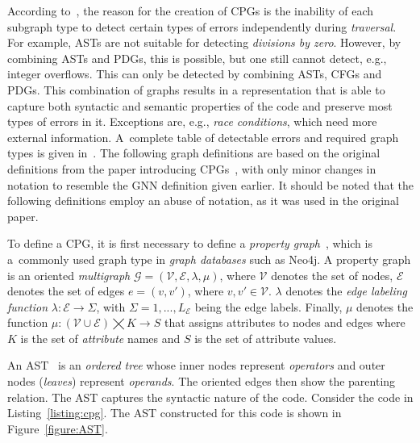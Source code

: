 According to~\cite{CPG-yamaguchi2014modeling}, the reason for the creation of CPGs is the inability of each subgraph type to detect certain types of errors independently during \textit{traversal}. For example, ASTs are not suitable for detecting \textit{divisions by zero}. However, by combining ASTs and PDGs, this is possible, but one still cannot detect, e.g., integer overflows. This can only be detected by combining ASTs, CFGs and PDGs. This combination of graphs results in a representation that is able to capture both syntactic and semantic properties of the code and preserve most types of errors in it. Exceptions are, e.g., \textit{race conditions}, which need more external information. A~complete table of detectable errors and required graph types is given in~\cite{CPG-yamaguchi2014modeling}. The following graph definitions are based on the original definitions from the paper introducing CPGs~\cite{CPG-yamaguchi2014modeling}, with only minor changes in notation to resemble the GNN definition given earlier. It should be noted that the following definitions employ an abuse of notation, as it was used in the original paper.

To define a CPG, it is first necessary to define a \textit{property graph}~\cite{CPG-yamaguchi2014modeling}, which is a~commonly used graph type in \textit{graph databases} such as Neo4j. A property graph is an oriented \textit{multigraph}  $\mathcal{G} = (\mathcal{V}, \mathcal{E}, \lambda, \mu)$, where $\mathcal{V}$ denotes the set of nodes, $\mathcal{E}$ denotes the set of edges $\mathit{e} = (\mathit{v}, \mathit{v}')$, where $\mathit{v}, \mathit{v}' \in \mathcal{V}$. $\lambda$ denotes the \textit{edge labeling function} $\lambda : \mathcal{E} \rightarrow \Sigma$, with $\Sigma = {1, ..., L_\mathcal{E}}$ being the edge labels. Finally, $\mu$ denotes the function $\mu: (\mathcal{V} \cup \mathcal{E}) \bigtimes K \rightarrow S$ that assigns attributes to nodes and edges where $K$ is the set of \textit{attribute} names and $S$ is the set of attribute values.

An AST~\cite{CPG-yamaguchi2014modeling} is an \textit{ordered tree} whose inner nodes represent \textit{operators} and outer nodes (\textit{leaves}) represent \textit{operands}. The oriented edges then show the parenting relation. The AST captures the syntactic nature of the code. Consider the code in Listing~\ref{listing:cpg}. The AST constructed for this code is shown in Figure~\ref{figure:AST}. 

